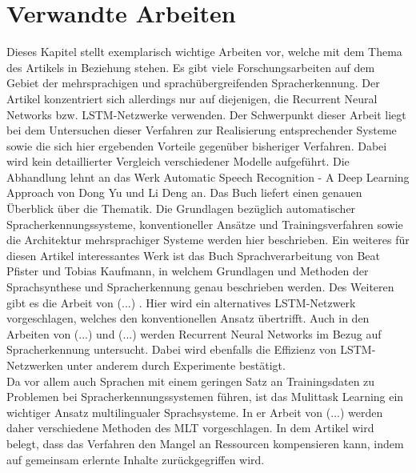 \section{Verwandte Arbeiten}
Dieses Kapitel stellt exemplarisch wichtige Arbeiten vor, welche mit dem Thema des Artikels in Beziehung stehen. Es gibt viele Forschungsarbeiten auf dem Gebiet der mehrsprachigen und sprachübergreifenden Spracherkennung. Der Artikel konzentriert sich allerdings nur auf diejenigen, die Recurrent Neural Networks bzw. LSTM-Netzwerke verwenden. Der Schwerpunkt dieser Arbeit liegt bei dem Untersuchen dieser Verfahren zur Realisierung entsprechender Systeme sowie die sich hier ergebenden Vorteile gegenüber bisheriger Verfahren. Dabei wird kein detaillierter Vergleich verschiedener Modelle aufgeführt.  
Die Abhandlung lehnt an das Werk Automatic Speech Recognition - A Deep Learning Approach von Dong Yu und Li Deng \cite{Yu.2014} an. Das Buch liefert einen genauen Überblick über die Thematik. Die Grundlagen bezüglich automatischer Spracherkennungssysteme, konventioneller Ansätze und Trainingsverfahren sowie die Architektur mehrsprachiger Systeme werden hier beschrieben.
Ein weiteres für diesen Artikel interessantes Werk ist das Buch Sprachverarbeitung von Beat Pfister und Tobias Kaufmann, in welchem Grundlagen und Methoden der Sprachsynthese und Spracherkennung genau beschrieben werden.  
Des Weiteren gibt es die Arbeit von (...) {\cite{2017arXiv170307090T}}. Hier wird ein alternatives LSTM-Netzwerk vorgeschlagen, welches den konventionellen Ansatz übertrifft. Auch in den Arbeiten von (...) {\cite{6638947}} und (...) {\cite{2014arXiv1402}} werden Recurrent Neural Networks im Bezug auf Spracherkennung untersucht. Dabei wird ebenfalls die Effizienz von LSTM-Netzwerken unter anderem durch Experimente bestätigt. \\Da vor allem auch Sprachen mit einem geringen Satz an Trainingsdaten zu Problemen bei Spracherkennungssystemen führen, ist das Mulittask Learning ein wichtiger Ansatz multilingualer Sprachsysteme. In er Arbeit von (...) werden daher verschiedene Methoden des MLT vorgeschlagen. In dem Artikel wird belegt, dass das Verfahren den Mangel an Ressourcen kompensieren kann, indem auf gemeinsam erlernte Inhalte zurückgegriffen wird.   


